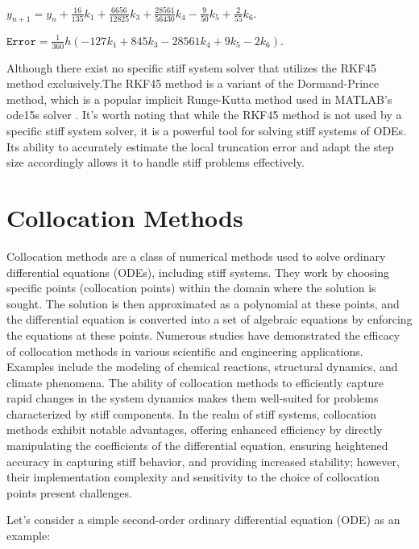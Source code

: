   \begin{math}
    y_{n+1} = y_n + \frac{16}{135}k_1 + \frac{6656}{12825}k_3 + \frac{28561}{56430}k_4 - \frac{9}{50}k_5 + \frac{2}{55}k_6.
  \end{math}

\begin{math}
  \mathtt{Error} = \frac{1}{360}h(-127k_1 + 845k_3 - 28561k_4 + 9k_5 - 2k_6).
\end{math}
  
  
Although there exist no specific stiff system solver that utilizes the RKF45 method exclusively.The RKF45 method is a variant of the Dormand-Prince method, which is a popular implicit Runge-Kutta method used in MATLAB's ode15s solver \cite{BurkardtRKF45}.
It's worth noting that while the RKF45 method is not used by a specific stiff system solver, it is a powerful tool for solving stiff systems of ODEs. Its ability to accurately estimate the local truncation error and adapt the step size accordingly allows it to handle stiff problems effectively.\cite{BurkardtRKF45}
  

\section{Collocation Methods}
Collocation methods are a class of numerical methods used to solve ordinary differential equations (ODEs), including stiff systems. They work by choosing specific points (collocation points) within the domain where the solution is sought. The solution is then approximated as a polynomial at these points, and the differential equation is converted into a set of algebraic equations by enforcing the equations at these points.
Numerous studies have demonstrated the efficacy of collocation methods in various scientific and engineering applications. Examples include the modeling of chemical reactions, structural dynamics, and climate phenomena. The ability of collocation methods to efficiently capture rapid changes in the system dynamics makes them well-suited for problems characterized by stiff components.
In the realm of stiff systems, collocation methods exhibit notable advantages, offering enhanced efficiency by directly manipulating the coefficients of the differential equation, ensuring heightened accuracy in capturing stiff behavior, and providing increased stability; however, their implementation complexity and sensitivity to the choice of collocation points present challenges\cite{Faleichik2009ExplicitIO}.

Let's consider a simple second-order ordinary differential equation (ODE) as an example:

